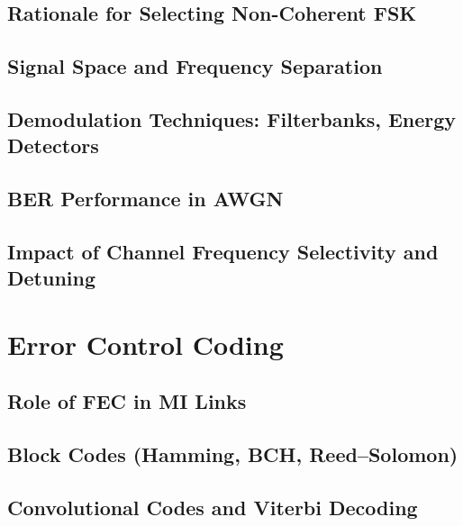 \subsection{Rationale for Selecting Non-Coherent FSK}\label{subsec:rationale-fsk}

\subsection{Signal Space and Frequency Separation}\label{subsec:frequency-separation}

\subsection{Demodulation Techniques: Filterbanks, Energy Detectors}\label{subsec:demodulation}

\subsection{BER Performance in AWGN}\label{subsec:ber-awgn}

\subsection{Impact of Channel Frequency Selectivity and Detuning}\label{subsec:selectivity-detuning}

\section{Error Control Coding}\label{sec:error-control-coding}
\subsection{Role of FEC in MI Links}\label{subsec:role-fec}

\subsection{Block Codes (Hamming, BCH, Reed--Solomon)}\label{subsec:block-codes}

\subsection{Convolutional Codes and Viterbi Decoding}\label{subsec:convolutional}

